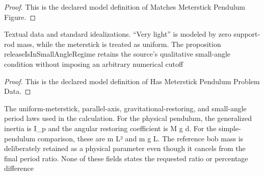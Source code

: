 \begin{proof}
  This is the declared model definition of Matches Meterstick Pendulum Figure.
\end{proof}
\begin{definition}
  \label{def:physics:phyx-mini-0227:phyxminiproblems-problemphyxmini0227-hasmeterstickpendulumproblemdata}
  Textual data and standard idealizations. “Very light” is modeled by zero support-rod mass, while the meterstick is treated as uniform. The proposition releaseIsInSmallAngleRegime retains the source's qualitative small-angle condition without imposing an arbitrary numerical cutoff
\end{definition}
\begin{proof}
  This is the declared model definition of Has Meterstick Pendulum Problem Data.
\end{proof}
\begin{definition}
  \label{def:physics:phyx-mini-0227:phyxminiproblems-problemphyxmini0227-satisfiespendulumlaws}
  The uniform-meterstick, parallel-axis, gravitational-restoring, and small-angle period laws used in the calculation. For the physical pendulum, the generalized inertia is I\_p and the angular restoring coefficient is M g d. For the simple-pendulum comparison, these are m L² and m g L. The reference bob mass is deliberately retained as a physical parameter even though it cancels from the final period ratio. None of these fields states the requested ratio or percentage difference
\end{definition}
